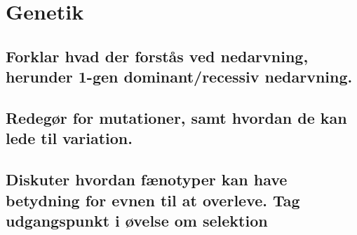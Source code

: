 \newpage
\section{Genetik}
\subsection{Forklar hvad der forstås ved nedarvning, herunder 1-gen dominant/recessiv nedarvning.}
\subsection{Redegør for mutationer, samt hvordan de kan lede til variation.}
\subsection{Diskuter hvordan fænotyper kan have betydning for evnen til at overleve. Tag udgangspunkt i øvelse om selektion}
